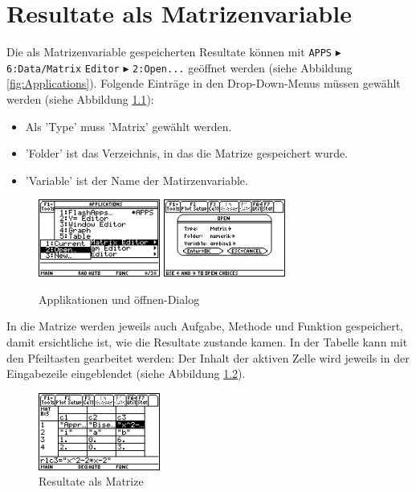 \documentclass[
	a4paper							%
	,12pt							%
	,twoside						%
	,openright						%
]{scrreprt}							%
\begin{document}
\chapter{Resultate als Matrizenvariable}
Die als Matrizenvariable gespeicherten Resultate k\"onnen mit \verb|APPS| $\blacktriangleright$ \verb|6:Data/Matrix| \verb|Editor| $\blacktriangleright$ \verb|2:Open...| ge\"offnet werden (siehe Abbildung \ref{fig:Applications}). Folgende Eintr\"age in den Drop-Down-Menus m\"ussen gew\"ahlt werden (siehe Abbildung \ref{fig:Open}):
\begin{itemize}
  \item Als 'Type' muss 'Matrix' gew\"ahlt werden.
  \item 'Folder' ist das Verzeichnis, in das die Matrize gespeichert wurde.
  \item 'Variable' ist der Name der Matirzenvariable.
\end{itemize}
% 
\begin{figure}[h]
  \centering
  \includegraphics[width=4cm]{img/nummeth_image050.png}
  \includegraphics[width=4cm]{img/nummeth_image052.png}
  \caption{Applikationen und \"offnen-Dialog}
  \label{fig:Open}
\end{figure}
% 
In die Matrize werden jeweils auch Aufgabe, Methode und Funktion gespeichert, damit ersichtliche ist, wie die Resultate zustande kamen. In der Tabelle kann mit den Pfeiltasten gearbeitet werden: Der Inhalt der aktiven Zelle wird jeweils in der Eingabezeile eingeblendet (siehe Abbildung \ref{fig:Matrix}).
\begin{figure}[h]
  \centering
  \includegraphics[width=4cm]{img/nummeth_image054.png}
  \caption{Resultate als Matrize}
  \label{fig:Matrix}
\end{figure}
\end{document}
